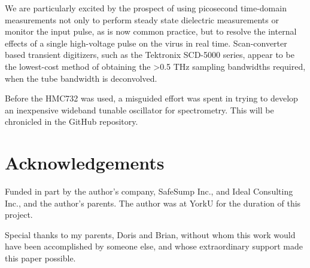 \documentclass[paper.tex]{subfiles}
\begin{document}
\begin{multicols}{1}
We are particularly excited by the prospect of using picosecond time-domain measurements not only to perform steady state dielectric measurements or monitor the input pulse, as is now common practice, but to resolve the internal effects of a single high-voltage pulse on the virus in real time. Scan-converter based transient digitizers, such as the Tektronix SCD-5000 series, appear to be the lowest-cost method of obtaining the >0.5 THz sampling bandwidths required, when the tube bandwidth is deconvolved.


%	

Before the HMC732 was used, a misguided effort was spent in trying to develop an inexpensive wideband tunable oscillator for spectrometry. This will be chronicled in the GitHub repository.

\end{multicols}

\section{Acknowledgements}

Funded in part by the author's company, SafeSump Inc., and Ideal Consulting Inc., and the author's parents. The author was at YorkU for the duration of this project.

Special thanks to my parents, Doris and Brian, without whom this work would have been accomplished by someone else, and whose extraordinary support made this paper possible.
\end{document}
